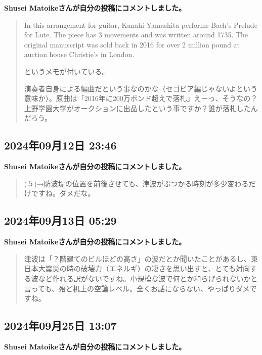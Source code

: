 \textbf{Shusei Matoikeさんが自分の投稿にコメントしました。}

\begin{quote}
In this arrangement for guitar, Kanahi Yamashita performs Bach’s Prelude for Lute. The piece has 3 movements and was written around 1735. The original manuscript was sold back in 2016 for over 2 million pound at auction house Christie’s in London.

というメモが付いている。

演奏者自身による編曲だという事なのかな（セゴビア編じゃないよという意味か）。原曲は「2016年に200万ポンド超えで落札」えーっ、そうなの？上野学園大学がオークションに出品したという事ですか？誰が落札したんだろう。
\end{quote}

\subsection*{2024年09月12日 23:46}

\textbf{Shusei Matoikeさんが自分の投稿にコメントしました。}

\begin{quote}
(５)→防波堤の位置を前後させても、津波がぶつかる時刻が多少変わるだけですね。ダメだな。
\end{quote}

\subsection*{2024年09月13日 05:29}

\textbf{Shusei Matoikeさんが自分の投稿にコメントしました。}

\begin{quote}
津波は「？階建てのビルほどの高さ」の波だとか聞いたことがあるし、東日本大震災の時の破壊力（エネルギ）の凄さを思い出すと、とても対向する波など作れる訳がないですね。小規模な波で何とか和らげられないかと言っても、殆ど机上の空論レベル。全くお話にならない、やっぱりダメですね。
\end{quote}

\subsection*{2024年09月25日 13:07}

\textbf{Shusei Matoikeさんが自分の投稿にコメントしました。}

